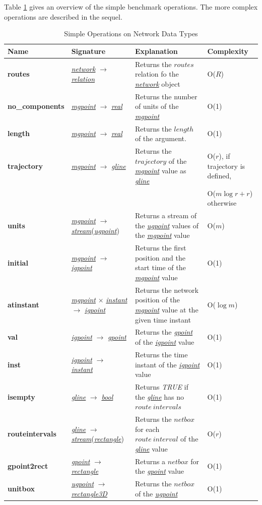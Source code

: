 \documentclass[a4paper]{article}
\newcommand{\op}[1]{\textbf{#1}}
\newcommand{\dt}[1]{\textsl{\underline{#1}}}
\newcommand{\true}{\textsl{TRUE}}
\begin{document}
Table \ref{tab:simplenetoperations} gives an overview of the simple benchmark
operations. The more complex operations are described in the sequel.
\begin{table}
  \caption{Simple Operations on Network Data Types}
  \label{tab:simplenetoperations}
  \begin{center}
  \begin{tabularx}{1.0\textwidth}{|l|l|X|X|}
  \hline
  \textbf{Name}& \textbf{Signature}& \textbf{Explanation}& \textbf{Complexity}\\
  \hline
\op{routes}& \dt{network} $\rightarrow$ \dt{relation} & Returns the $routes$
relation fo the \dt{network} object & O($R$)\\
  \hline
\op{no\_components}&\dt{mgpoint} $\rightarrow$ \dt{real}& Returns the number of
units of the \dt{mgpoint} &O(1)\\
  \hline
\op{length}&\dt{mgpoint} $\rightarrow$ \dt{real}& Returns the $length$ of the
argument.&O(1)\\
  \hline
\op{trajectory}&\dt{mgpoint} $\rightarrow$ \dt{gline}& Returns the $trajectory$
of the \dt{mgpoint} value as \dt{gline}&O($r$), if trajectory is defined,\\
&&&O($m \log r + r$) otherwise\\
  \hline
\op{units}&\dt{mgpoint} $\rightarrow$ \dt{stream}(\dt{ugpoint})& Returns a
stream
of the \dt{ugpoint} values of the \dt{mgpoint} value& O($m$)\\
  \hline
\op{initial}&\dt{mgpoint} $\rightarrow$ \dt{igpoint}& Returns the first position
and the start time of the \dt{mgpoint} value& O(1)\\
  \hline
\op{atinstant}&\dt{mgpoint} $\times$ \dt{instant} $\rightarrow$ \dt{igpoint}&
Returns the network position of the \dt{mgpoint} value at the given time instant&
O($\log m$)\\
  \hline
\op{val}&\dt{igpoint} $\rightarrow$ \dt{gpoint}& Returns the \dt{gpoint} of the
\dt{igpoint} value&O(1)\\
  \hline
\op{inst}&\dt{igpoint} $\rightarrow$ \dt{instant}& Returns the time instant of the
\dt{igpoint} value &O(1)\\
  \hline
\op{isempty}&\dt{gline} $\rightarrow$ \dt{bool}& Returns \true{} if the \dt{gline}
has no $route\ intervals$ & O(1)\\
  \hline
\op{routeintervals}&\dt{gline} $\rightarrow$ \dt{stream}(\dt{rectangle})& Returns
the $netbox$ for each $route\ interval$ of the \dt{gline} value& O($r$)\\
  \hline
\op{gpoint2rect}& \dt{gpoint} $\rightarrow$ \dt{rectangle} & Returns a $netbox$
for the \dt{gpoint} value & O(1)\\
\hline
\op{unitbox}& \dt{ugpoint} $\rightarrow$ \dt{rectangle3D} & Returns the $netbox$
of the \dt{ugpoint} & O(1)\\
  \hline
  \end{tabularx}
  \end{center}
\end{table}
\end{document}
